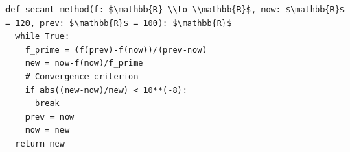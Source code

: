 \documentclass[border=10pt]{standalone}
\begin{document}
\begin{lstlisting}
def secant_method(f: $\mathbb{R} \\to \\mathbb{R}$, now: $\mathbb{R}$ = 120, prev: $\mathbb{R}$ = 100): $\mathbb{R}$                                            
  while True: 
    f_prime = (f(prev)-f(now))/(prev-now)        
    new = now-f(now)/f_prime                       
    # Convergence criterion 
    if abs((new-now)/new) < 10**(-8):           
      break 
    prev = now
    now = new
  return new
\end{lstlisting}
\end{document}
